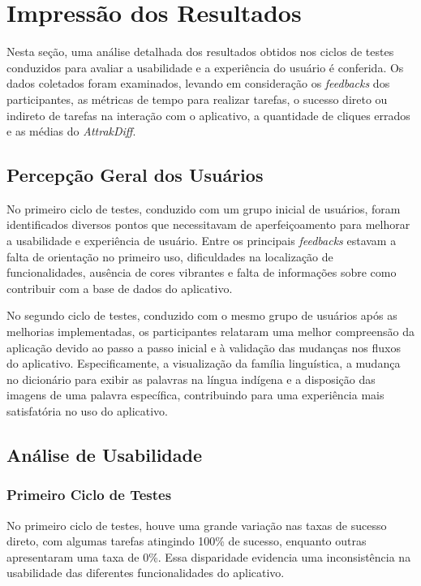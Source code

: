 \section{Impressão dos Resultados}
\label{sec:Impressão dos Resultados}
Nesta seção, uma análise detalhada dos resultados obtidos nos ciclos de testes conduzidos para avaliar a usabilidade e a experiência do usuário é conferida. Os dados coletados foram examinados, levando em consideração os \textit{feedbacks} dos participantes, as métricas de 
tempo para realizar tarefas, o sucesso direto ou indireto de tarefas na interação com o aplicativo, a quantidade de cliques errados e as médias do \textit{AttrakDiff}.

\subsection{Percepção Geral dos Usuários}
\label{sec:Percepção Geral dos Usuários}
No primeiro ciclo de testes, conduzido com um grupo inicial de usuários, foram identificados diversos pontos que necessitavam de aperfeiçoamento para melhorar a usabilidade e experiência de usuário. Entre os principais \textit{feedbacks} estavam a falta de orientação no primeiro uso, 
dificuldades na localização de funcionalidades, ausência de cores vibrantes e falta de informações sobre como contribuir com a base de dados do aplicativo.

No segundo ciclo de testes, conduzido com o mesmo grupo de usuários após as melhorias implementadas, os participantes relataram uma melhor compreensão da aplicação devido ao passo a passo inicial e à validação das mudanças nos fluxos do aplicativo. Especificamente, a visualização da 
família linguística, a mudança no dicionário para exibir as palavras na língua indígena e a disposição das imagens de uma palavra específica, contribuindo para uma experiência mais satisfatória no uso do aplicativo.

\subsection{Análise de Usabilidade}
\label{sec:Análise de Usabilidade}

\subsubsection{Primeiro Ciclo de Testes}
\label{sec:Primeiro Ciclo de Testes}

No primeiro ciclo de testes, houve uma grande variação nas taxas de sucesso direto, com algumas tarefas atingindo 100\% de sucesso, enquanto outras apresentaram uma taxa de 0\%. Essa disparidade evidencia uma inconsistência na usabilidade das diferentes funcionalidades do aplicativo.


